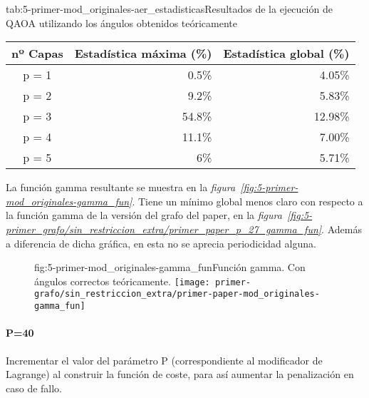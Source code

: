\begin{table}[htbp]{tab:5-primer-mod_originales-aer_estadisticas}{Resultados de la ejecución de QAOA utilizando los ángulos obtenidos teóricamente}
  \centering
  \begin{tabular}{|c|r|r|}
    \hline
    \textbf{nº Capas} & \textbf{Estadística máxima (\%)} & \textbf{Estadística global (\%)} \\ \hline
    p = 1             &  0.5\%                           &  4.05\%                          \\ \hline
    p = 2             &  9.2\%                           &  5.83\%                          \\ \hline
    p = 3             & 54.8\%                           & 12.98\%                          \\ \hline
    p = 4             & 11.1\%                           &  7.00\%                          \\ \hline
    p = 5             &    6\%                           &  5.71\%                          \\ \hline
  \end{tabular}
\end{table}

La función gamma resultante se muestra en la \textit{figura~\ref{fig:5-primer-mod_originales-gamma_fun}}.
Tiene un mínimo global menos claro con respecto a la función gamma de la versión del grafo del paper, en la \textit{figura~\ref{fig:5-primer_grafo/sin_restriccion_extra/primer_paper_p_27_gamma_fun}}.
Además a diferencia de dicha gráfica, en esta no se aprecia periodicidad alguna.

\begin{figure}[htbp]{fig:5-primer-mod_originales-gamma_fun}{Función gamma. Con ángulos correctos teóricamente.}
  \centering
  \texttt{[image: primer-grafo/sin\_restriccion\_extra/primer-paper-mod\_originales-gamma\_fun]}
\end{figure}

\paragraph{P=40}
Incrementar el valor del parámetro P (correspondiente al modificador de Lagrange)
al construir la función de coste, para así aumentar la penalización en caso de fallo.

